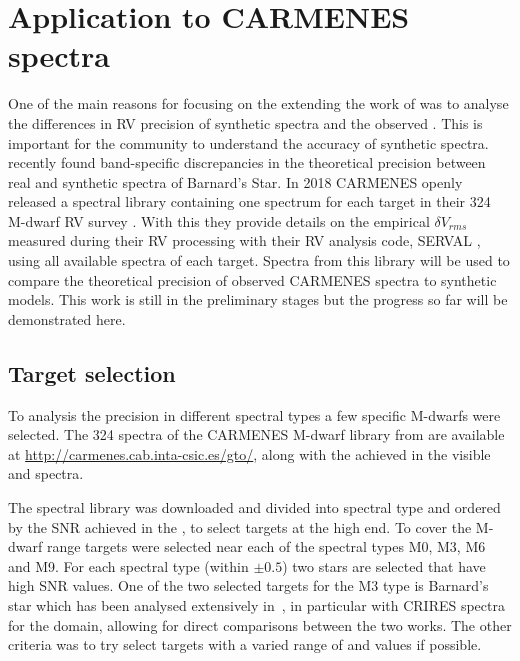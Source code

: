 
\section{Application to {CARMENES} spectra}

One of the main reasons for focusing on the extending the work of\citet{figueira_radial_2016} was to analyse the differences in {RV} precision of synthetic spectra and the observed \nir{}.
This is important for the community to understand the accuracy of synthetic spectra.
\citet{artigau_optical_2018} recently found band-specific discrepancies in the theoretical precision between real and synthetic \nir{} spectra of Barnard's Star.
In 2018 {CARMENES} openly released a spectral library containing one spectrum for each target in their 324 M-dwarf {RV} survey \citet{reiners_carmenes_2018}.
With this they provide details on the empirical \(\delta V_{rms}\) measured during their {RV} processing with their {RV} analysis code, {SERVAL} \citep{zechmeister_spectrum_2018}, using all available spectra of each target.
Spectra from this library will be used to compare the theoretical precision of observed {CARMENES} spectra to synthetic models.
This work is still in the preliminary stages but the progress so far will be demonstrated here.

\subsection{Target selection}
\label{subsec:carmense_targets}
To analysis the precision in different spectral types a few specific M-dwarfs were selected.
The 324 spectra of the {CARMENES} M-dwarf library from \citet{reiners_carmenes_2018} are available at \href{http://carmenes.cab.inta-csic.es/gto/}{http://carmenes.cab.inta-csic.es/gto/}, along with the achieved \snr{} in the visible and \nir{} spectra.

The spectral library was downloaded and divided into spectral type and ordered by the {SNR} achieved in the \nir{}, to select targets at the high \snr{} end.
To cover the M-dwarf range targets were selected near each of the spectral types M0, M3, M6 and M9.
For each spectral type (within $\pm0.5$) two stars are selected that have high {SNR} values.
One of the two selected targets for the M3 type is Barnard's star which has been analysed extensively in~\citet{artigau_optical_2018}, in particular with CRIRES spectra for the \nir{} domain, allowing for direct comparisons between the two works.
The other criteria was to try select targets with a varied range of \Logg and \feh{} values if possible.

